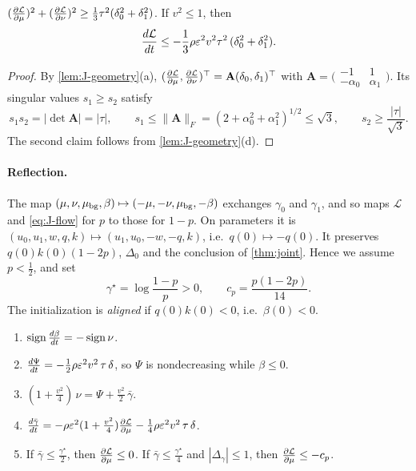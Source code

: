 \begin{lemma}
\label{lem:J-gradient}
$(\pd{\mathcal L}{\cnt})^2+(\pd{\mathcal L}{\nu})^2\ge\frac{1}{3}\tau^2(\delta_0^2+\delta_1^2)$. If $v^2\le1$, then
\[
 \ddt{\mathcal L}\le-\tfrac{1}{3}\rho\initscale^2v^2\tau^2\,(\delta_0^2+\delta_1^2).
\]
\end{lemma}

\begin{proof}
By \cref{lem:J-geometry}(a), $(\pd{\mathcal L}{\cnt},\pd{\mathcal L}{\nu})^\top=\mathbf A(\delta_0,\delta_1)^\top$ with $\mathbf A=\bigl(\begin{smallmatrix}-1&1\\-\alpha_0&\alpha_1\end{smallmatrix}\bigr)$. Its singular values $s_1\ge s_2$
satisfy
\[
 s_1s_2=|\det\mathbf A|=|\tau|,\qquad s_1\le\|\mathbf A\|_F=(2+\alpha_0^2+\alpha_1^2)^{1/2}\le\sqrt3,\qquad s_2\ge\frac{|\tau|}{\sqrt3} .
\]
The second claim follows from \cref{lem:J-geometry}(d).
\end{proof}

\paragraph{Reflection.} The map $(\mu,\nu,\mu_{\mathrm{bg}},\beta)\mapsto(-\mu,-\nu,\mu_{\mathrm{bg}},-\beta)$ exchanges $\gamma_0$ and $\gamma_1$, and so maps $\mathcal L$ and \cref{eq:J-flow} for $p$ to those
for $1-p$. On parameters it is $(u_0,u_1,w,q,k)\mapsto(u_1,u_0,-w,-q,k)$, i.e.\ $q(0)\mapsto-q(0)$. It preserves $q(0)k(0)(1-2p)$, $\Delta_0$ and the
conclusion of \cref{thm:joint}. Hence we assume $p<\frac{1}{2}$, and set
\[
 \gamma^\star=\log\frac{1-p}{p}>0,\qquad c_p=\frac{p(1-2p)}{14}.
\]
The initialization is \emph{aligned} if $q(0)k(0)<0$, i.e.\ $\beta(0)<0$.

\begin{lemma}
\label{lem:J-drift}
\begin{enumerate}[label=(\alph*),leftmargin=*,itemsep=2pt,topsep=3pt]
\item $\operatorname{sign}\ddt{\beta}=-\operatorname{sign}\nu$.
\item $\ddt{\Psi}=-\frac{1}{2}\rho\initscale^2v^2\,\tau\,\delta$, so $\Psi$ is nondecreasing while $\beta\le0$.
\item $(1+\frac{v^2}{4})\,\nu=\Psi+\frac{v^2}{2}\,\bar\gamma$.
\item $\ddt{\bar\gamma}=-\rho\initscale^2(1+\frac{v^2}{4})\pd{\mathcal L}{\cnt}-\frac{1}{4}\rho\initscale^2v^2\,\tau\,\delta$.
\item If $\bar\gamma\le\frac{\gamma^\star}{2}$, then $\pd{\mathcal L}{\cnt}\le0$. If $\bar\gamma\le\frac{\gamma^\star}{4}$ and $|\Delta_\gamma|\le1$, then $\pd{\mathcal L}{\cnt}\le-c_p$.
\end{enumerate}
\end{lemma}

